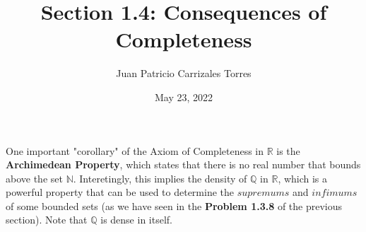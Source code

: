 \documentclass[12pt]{article}
\newcommand{\N}{\mathbb{N}}
\newcommand{\R}{\mathbb{R}}
\newcommand{\Q}{\mathbb{Q}}
\begin{document}
 
	
	\title{Section 1.4: Consequences of Completeness}
	\author{Juan Patricio Carrizales Torres}
	\date{May 23, 2022}
	\maketitle
	
	One important "corollary" of the Axiom of Completeness in $\R$ is the \textbf{Archimedean Property}, which states that there is no real number that bounds above the set $\N$. Interetingly, this implies the density of $\Q$ in $\R$, which is a powerful property that can be used to determine the $supremums$ and $infimums$ of some bounded sets (as we have seen in the \textbf{Problem 1.3.8} of the previous section). Note that $\Q$ is dense in itself. 
	
\end{document}
